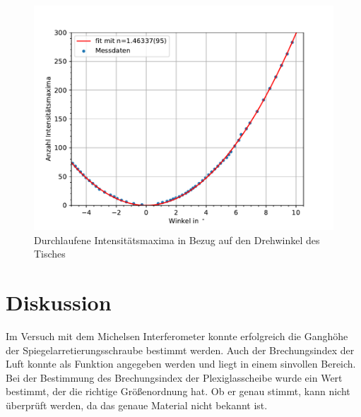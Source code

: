\documentclass[11pt, a4paper]{article}
\begin{document}
    \begin{figure}[!h]
        \centering
        \includegraphics[width=\textwidth]{./plots/plexi.pdf}

        \caption{Durchlaufene Intensitätsmaxima in Bezug auf den Drehwinkel des Tisches}
        \label{fig:plexiplot}
    \end{figure}

    \section{Diskussion}
    Im Versuch mit dem Michelsen Interferometer konnte erfolgreich die Ganghöhe der Spiegelarretierungsschraube bestimmt werden.
    Auch der Brechungsindex der Luft konnte als Funktion angegeben werden und liegt in einem sinvollen Bereich.
    Bei der Bestimmung des Brechungsindex der Plexiglasscheibe wurde ein Wert bestimmt, der die richtige Größenordnung hat. Ob er genau stimmt, kann nicht überprüft werden, da das genaue Material nicht bekannt ist.
    
    
\end{document}
